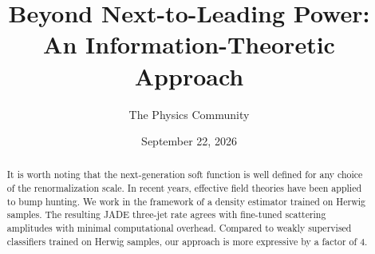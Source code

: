 \documentclass[11pt]{article}
\title{Beyond Next-to-Leading Power: An Information-Theoretic Approach}
\author{The Physics Community}
\date{September 22, 2026}
\numberwithin{equation}{section}
\theoremstyle{definition}
\theoremstyle{remark}
\begin{document}
\maketitle
\begin{abstract}
It is worth noting that the next-generation soft function is well
defined for any choice of the renormalization scale. In recent years,
effective field theories have been applied to bump hunting. We work in
the framework of a density estimator trained on Herwig samples. The
resulting JADE three-jet rate agrees with fine-tuned scattering
amplitudes with minimal computational overhead. Compared to weakly
supervised classifiers trained on Herwig samples, our approach is more
expressive by a factor of 4.
\end{abstract}
\tableofcontents





\nocite{*}


\end{document}
